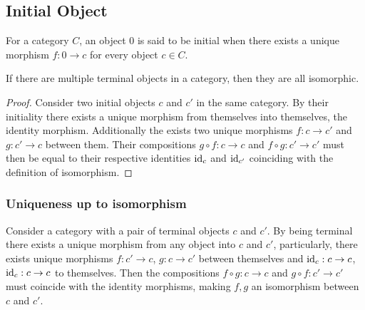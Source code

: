 \subsection{Initial Object}

\begin{definition}
  For a category $C$, an object $0$ is said to be initial when there exists a
  unique morphism $f: 0\to c$ for every object $c\in C$.
  \parencite{awodey:category_theory}
\end{definition}

\begin{theorem}\label{thm:init_obj_iso} If
  there are multiple terminal objects in a category, then they are all
  isomorphic.

  \begin{proof}
    Consider two initial objects $c$ and $c'$ in the same category. By their
    initiality there exists a unique morphism from themselves into themselves,
    the identity morphism. Additionally the exists two unique morphisms $f:c\to
    c'$ and $g:c' \to c$ between them. Their compositions $g\circ f:c\to c$ and
    $f\circ g:c'\to c'$ must then be equal to their respective identities
    $\mathrm{id}_c$ and $\mathrm{id}_{c'}$ coinciding with the definition of isomorphism.
  \end{proof}
\end{theorem}

\subsubsection*{Uniqueness up to isomorphism}

Consider a category with a pair of terminal objects $c$ and $c'$. By being
terminal there exists a unique morphism from any object into $c$ and $c'$,
particularly, there exists unique morphisms $f: c' \to c$, $g: c \to c'$ between
themselves and $\mathrm{id}_c: c\to c$, $\mathrm{id}_c: c\to c$ to themselves.
Then the compositions $f\circ g:c\to c$ and $g\circ f:c' \to c'$ must coincide
with the identity morphisms, making $f,g$ an isomorphism between $c$ and $c'$.